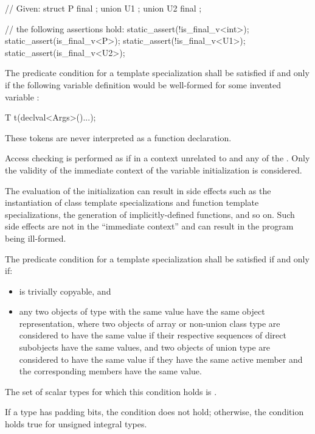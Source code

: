 \pnum
\begin{example}
\begin{codeblock}
// Given:
struct P final { };
union U1 { };
union U2 final { };

// the following assertions hold:
static_assert(!is_final_v<int>);
static_assert(is_final_v<P>);
static_assert(!is_final_v<U1>);
static_assert(is_final_v<U2>);
\end{codeblock}
\end{example}

%
\pnum
The predicate condition for a template specialization
 shall be satisfied if and only if the
following variable definition would be well-formed for some invented variable :

\begin{codeblock}
T t(declval<Args>()...);
\end{codeblock}

\begin{note} These tokens are never interpreted as a function declaration.
\end{note} Access checking is performed as if in a context unrelated to 
and any of the . Only the validity of the immediate context of the
variable initialization is considered. \begin{note} The evaluation of the
initialization can result in side effects such as the instantiation of class
template specializations and function template specializations, the generation
of implicitly-defined functions, and so on. Such side effects are not in the
``immediate context'' and can result in the program being ill-formed. \end{note}

%
\pnum
The predicate condition for a template specialization
shall be satisfied if and only if:
\begin{itemize}
\item {} is trivially copyable, and
\item any two objects of type  with the same value
have the same object representation, where
two objects of array or non-union class type are considered to have the same value
if their respective sequences of direct subobjects have the same values, and
two objects of union type are considered to have the same value
if they have the same active member and the corresponding members have the same value.
\end{itemize}
The set of scalar types for which this condition holds is
.
\begin{note} If a type has padding bits, the condition does not hold;
otherwise, the condition holds true for unsigned integral types. \end{note}

